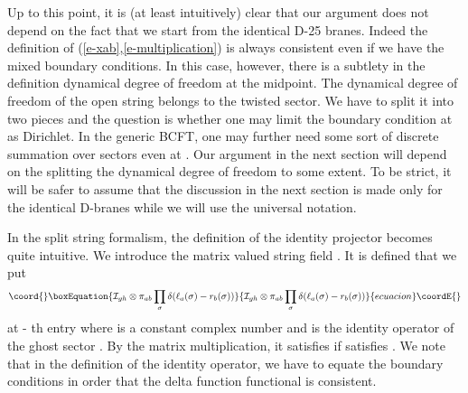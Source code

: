 \documentclass[a4paper,12pt]{article}
\begin{document}
Up to this point, it is (at least intuitively) clear 
that our argument does not depend on the fact that we start from the 
\coordHE{} identical D-25 branes.  Indeed the definition of
(\ref{e-xab},\ref{e-multiplication}) 
is always consistent even if we have the mixed boundary
conditions.
In this case, however, there is a subtlety in the definition
dynamical degree of freedom at the midpoint.  The dynamical
degree of freedom of the open string \coordHE{} belongs to the
twisted sector. We have to split it into two pieces and the question
is whether one may limit the boundary condition at \coordHE{} 
as Dirichlet.  In the generic BCFT, one may further need some
sort of discrete summation over sectors even at \coordHE{}. 
Our argument in the next section will depend on the splitting
the dynamical degree of freedom to some extent.  To be strict,
it will be safer to assume that the discussion in the next section 
is made only for the \coordHE{} identical D-branes while we will use
the universal notation.

In the split string formalism, the definition
of the identity projector becomes quite
intuitive.  We introduce the \coordHE{} 
matrix valued string field \coordHE{}. It is defined that we put
\begin{equation}\coord{}\boxEquation{
\cI_{gh}\otimes \pi_{ab}\prod_\sigma\delta(\ell_a(\sigma)-r_b(\sigma))
}{
\cI_{gh}\otimes \pi_{ab}\prod_\sigma\delta(\ell_a(\sigma)-r_b(\sigma))
}{ecuacion}\coordE{}\end{equation}
at \coordHE{}-\coordHE{} th entry where \coordHE{} is a constant complex number
and \coordHE{} is the identity operator of the ghost sector
\cite{r-AAB, r-GT2}.  By the matrix multiplication, it satisfies
\coordHE{} if \coordHE{} satisfies \coordHE{}.
We note that in the definition of the identity
operator, we have to equate the boundary conditions
in order that the delta function functional \coordHE{}
is consistent.
\end{document}
